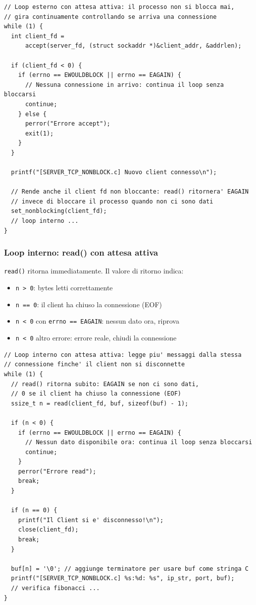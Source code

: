 \documentclass[a4paper,12pt]{article}
\begin{document}
\begin{lstlisting}[caption={server\_tcp\_nonblock.c - accept() con attesa attiva}]
// Loop esterno con attesa attiva: il processo non si blocca mai,
// gira continuamente controllando se arriva una connessione
while (1) {
  int client_fd =
      accept(server_fd, (struct sockaddr *)&client_addr, &addrlen);

  if (client_fd < 0) {
    if (errno == EWOULDBLOCK || errno == EAGAIN) {
      // Nessuna connessione in arrivo: continua il loop senza bloccarsi
      continue;
    } else {
      perror("Errore accept");
      exit(1);
    }
  }

  printf("[SERVER_TCP_NONBLOCK.c] Nuovo client connesso\n");

  // Rende anche il client fd non bloccante: read() ritornera' EAGAIN
  // invece di bloccare il processo quando non ci sono dati
  set_nonblocking(client_fd);
  // loop interno ...
}
\end{lstlisting}
\FloatBarrier

\subsubsection{Loop interno: read() con attesa attiva}
\texttt{read()} ritorna immediatamente. Il valore di ritorno indica:
\begin{itemize}
    \item \texttt{n > 0}: bytes letti correttamente
    \item \texttt{n == 0}: il client ha chiuso la connessione (EOF)
    \item \texttt{n < 0} con \texttt{errno == EAGAIN}: nessun dato ora, riprova
    \item \texttt{n < 0} altro errore: errore reale, chiudi la connessione
\end{itemize}

\begin{lstlisting}[caption={server\_tcp\_nonblock.c - read() con attesa attiva}]
// Loop interno con attesa attiva: legge piu' messaggi dalla stessa
// connessione finche' il client non si disconnette
while (1) {
  // read() ritorna subito: EAGAIN se non ci sono dati,
  // 0 se il client ha chiuso la connessione (EOF)
  ssize_t n = read(client_fd, buf, sizeof(buf) - 1);

  if (n < 0) {
    if (errno == EWOULDBLOCK || errno == EAGAIN) {
      // Nessun dato disponibile ora: continua il loop senza bloccarsi
      continue;
    }
    perror("Errore read");
    break;
  }

  if (n == 0) {
    printf("Il Client si e' disconnesso!\n");
    close(client_fd);
    break;
  }

  buf[n] = '\0'; // aggiunge terminatore per usare buf come stringa C
  printf("[SERVER_TCP_NONBLOCK.c] %s:%d: %s", ip_str, port, buf);
  // verifica fibonacci ...
}
\end{lstlisting}
\FloatBarrier
\end{document}
